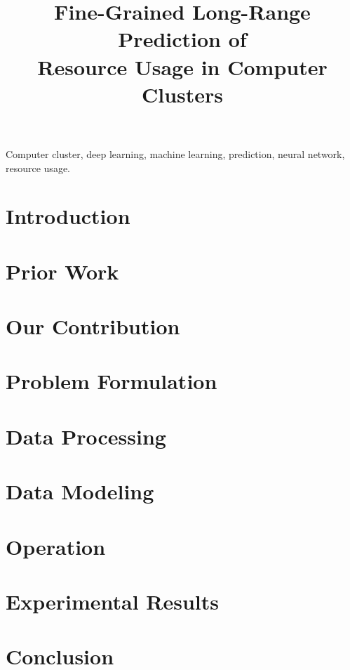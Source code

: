 \documentclass[journal]{IEEEtran}
\title{
  Fine-Grained Long-Range Prediction of\\
  Resource Usage in Computer Clusters
}
\author{}
\begin{document}
  \maketitle

  \begin{abstract}
    
  \end{abstract}

  \begin{IEEEkeywords}
    Computer cluster,
    deep learning,
    machine learning,
    prediction,
    neural network,
    resource usage.
  \end{IEEEkeywords}


  \section{Introduction} 
  

  \section{Prior Work} 
  

  \section{Our Contribution} 
  

  \section{Problem Formulation} 
  

  \section{Data Processing} 
  

  \section{Data Modeling} 
  

  \section{Operation} 
  

  \section{Experimental Results} 
  

  \section{Conclusion} 
  

  
  
\end{document}

